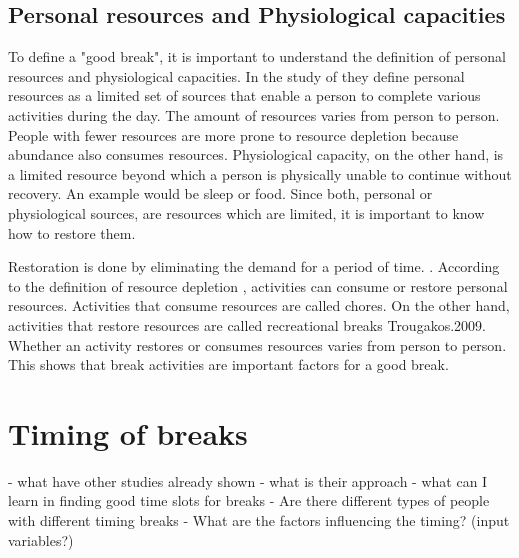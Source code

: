\documentclass{hasel_thesis}
\begin{document}
\subsection{Personal resources and Physiological capacities}
To define a "good break", it is important to understand the definition of personal resources and physiological capacities. In the study of \cite{BaumeisterR.F.BratslavskyE.MuravenM.&TiceD.M..1998} they define personal resources as a limited set of sources that enable a person to complete various activities during the day. The amount of resources varies from person to person. People with fewer resources are more prone to resource depletion because abundance also consumes resources. Physiological capacity, on the other hand, is a limited resource beyond which a person is physically unable to continue without recovery. An example would be sleep or food. Since both, personal or physiological sources, are resources which are limited, it is important to know how to restore them.

Restoration is done by eliminating the demand for a period of time. \cite{Trougakos.2009}. According to the definition of resource depletion \cite{BaumeisterR.F.BratslavskyE.MuravenM.&TiceD.M..1998}, activities can consume or restore personal resources. 
Activities that consume resources are called chores. On the other hand, activities that restore resources are called recreational breaks {Trougakos.2009}.
Whether an activity restores or consumes resources varies from person to person. 
This shows that break activities are important factors for a good break.




\section{Timing of breaks}
- what have other studies already shown
- what is their approach
- what can I learn in finding good time slots for breaks
- Are there different types of people with different timing breaks
- What are the factors influencing the timing? (input variables?)
\end{document}

